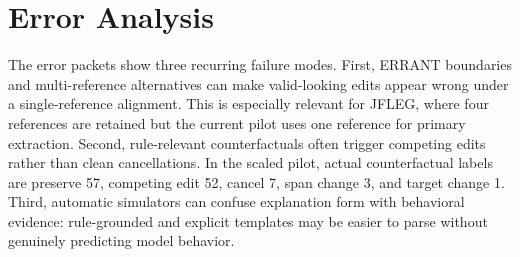 \section{Error Analysis}




The error packets show three recurring failure modes. First, ERRANT boundaries and multi-reference alternatives can make valid-looking edits appear wrong under a single-reference alignment. This is especially relevant for JFLEG, where four references are retained but the current pilot uses one reference for primary extraction. Second, rule-relevant counterfactuals often trigger competing edits rather than clean cancellations. In the scaled pilot, actual counterfactual labels are preserve 57, competing edit 52, cancel 7, span change 3, and target change 1. Third, automatic simulators can confuse explanation form with behavioral evidence: rule-grounded and explicit templates may be easier to parse without genuinely predicting model behavior.
